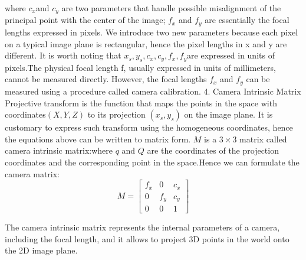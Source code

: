 \documentclass{article}
\begin{document}
where $c_x$and $c_y$
are two parameters that handle possible misalignment of the principal point with the center of the image; $f_x$ and $f_y$
are essentially the focal lengths expressed in pixels. We introduce two new parameters because each pixel on a typical image plane is rectangular, hence the pixel lengths in x and y are different. It is worth noting that $x_s,y_s,c_x,c_y,f_x,f_y$are expressed in units of pixels.The physical focal length f, usually expressed in units of millimeters, cannot be measured directly. However, the focal lengths $f_x$ and $f_y$ can be measured using a procedure called camera calibration.
4. Camera Intrinsic Matrix
Projective transform is the function that maps the points in the space with coordinates$(X, Y, Z)$ to its projection $(x_s, y_s)$ on the image plane. It is customary to express such transform using the homogeneous coordinates, hence the equations above can be written to matrix form.
$M$ is a $3\times3$ matrix called camera intrinsic matrix:where $q$ and $Q$ are the coordinates of the projection coordinates  and the corresponding point in the space.Hence we can formulate the camera matrix:
\begin{equation}
    M = \begin{bmatrix}
        f_x&0&c_x \\
        0&f_y&c_y \\
        0&0&1
    \end{bmatrix}
\end{equation} 

The camera intrinsic matrix represents the internal parameters of a camera, including the focal length, and it allows to project 3D points in the world onto the 2D image plane.
\end{document}
